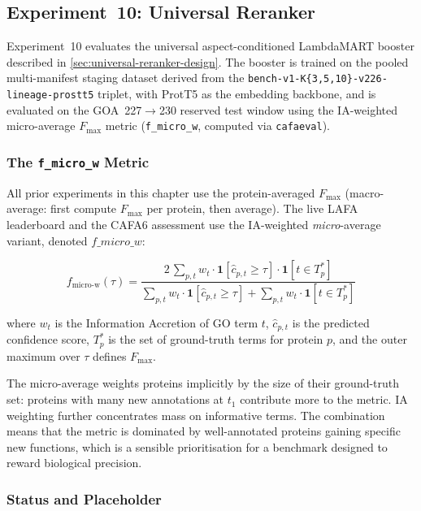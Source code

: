 \subsection{Experiment~10: Universal Reranker}
\label{subsec:exp10-universal}

Experiment~10 evaluates the universal aspect-conditioned LambdaMART booster
described in \cref{sec:universal-reranker-design}. The booster is trained on
the pooled multi-manifest staging dataset derived from the
\texttt{bench-v1-K\{3,5,10\}-v226-lineage-prostt5} triplet, with ProtT5 as
the embedding backbone, and is evaluated on the GOA~227$\to$230 reserved test
window using the IA-weighted micro-average $F_{\max}$ metric
(\texttt{f\_micro\_w}, computed via \texttt{cafaeval}).

\subsubsection{The \texttt{f\_micro\_w} Metric}
\label{subsubsec:f-micro-w}

All prior experiments in this chapter use the protein-averaged $F_{\max}$
(macro-average: first compute $F_{\max}$ per protein, then average). The live
LAFA leaderboard and the CAFA6 assessment use the IA-weighted
\emph{micro}-average variant, denoted $f\_micro\_w$:

\begin{equation}
  f_{\mathrm{micro\text{-}w}}(\tau) =
    \frac{2 \, \sum_{p,t} w_t \cdot \mathbf{1}[\hat{c}_{p,t} \ge \tau] \cdot \mathbf{1}[t \in T_p^*]}
         {\sum_{p,t} w_t \cdot \mathbf{1}[\hat{c}_{p,t} \ge \tau]
         + \sum_{p,t} w_t \cdot \mathbf{1}[t \in T_p^*]}
\end{equation}

where $w_t$ is the Information Accretion of GO term $t$, $\hat{c}_{p,t}$ is
the predicted confidence score, $T_p^*$ is the set of ground-truth terms for
protein $p$, and the outer maximum over $\tau$ defines $F_{\max}$.

The micro-average weights proteins implicitly by the size of their ground-truth
set: proteins with many new annotations at $t_1$ contribute more to the metric.
IA weighting further concentrates mass on informative terms. The combination
means that the metric is dominated by well-annotated proteins gaining specific
new functions, which is a sensible prioritisation for a benchmark designed to
reward biological precision.

\subsubsection{Status and Placeholder}

